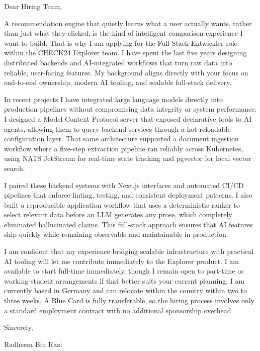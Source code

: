 \documentclass[11pt,a4paper]{coverletter}
\begin{document}

\opening{Dear Hiring Team,}

A recommendation engine that quietly learns what a user actually wants, rather than just what they clicked, is the kind of intelligent comparison experience I want to build. That is why I am applying for the Full-Stack Entwickler role within the CHECK24 Explorer team. I have spent the last five years designing distributed backends and AI-integrated workflows that turn raw data into reliable, user-facing features. My background aligns directly with your focus on end-to-end ownership, modern AI tooling, and scalable full-stack delivery.

In recent projects I have integrated large language models directly into production pipelines without compromising data integrity or system performance. I designed a Model Context Protocol server that exposed declarative tools to AI agents, allowing them to query backend services through a hot-reloadable configuration layer. That same architecture supported a document ingestion workflow where a five-step extraction pipeline ran reliably across Kubernetes, using NATS JetStream for real-time state tracking and pgvector for local vector search.

I paired these backend systems with Next.js interfaces and automated CI/CD pipelines that enforce linting, testing, and consistent deployment patterns. I also built a reproducible application workflow that uses a deterministic ranker to select relevant data before an LLM generates any prose, which completely eliminated hallucinated claims. This full-stack approach ensures that AI features ship quickly while remaining observable and maintainable in production.

I am confident that my experience bridging scalable infrastructure with practical AI tooling will let me contribute immediately to the Explorer product. I am available to start full-time immediately, though I remain open to part-time or working-student arrangements if that better suits your current planning. I am currently based in Germany and can relocate within the country within two to three weeks. A Blue Card is fully transferable, so the hiring process involves only a standard employment contract with no additional sponsorship overhead.

\closing{Sincerely,}{Radheem Bin Razi}

\clearpage
{}
\end{document}
